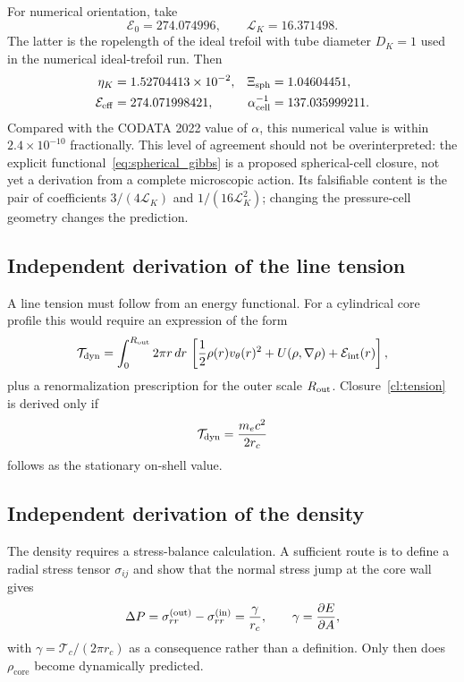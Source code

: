 \documentclass[aps,pra,preprint,longbibliography,nofootinbib]{revtex4-2}
\newcommand{\Et}{\mathcal{E}_0}                    %
\newcommand{\LK}{\mathcal{L}_K}                     %
\newcommand{\Xsph}{\Xi_{\mathrm{sph}}}             %
\begin{document}
For numerical orientation, take
\begin{equation}
  \Et=274.074996,
  \qquad
  \LK=16.371498 .
  \label{eq:numerical_E0_LK}
\end{equation}
The latter is the ropelength of the ideal trefoil with tube diameter
$D_K=1$ used in the numerical ideal-trefoil run.  Then
\begin{align}
  \eta_K &= 1.52704413\times10^{-2},
  &\Xsph &= 1.04604451,
  \label{eq:Xi_numbers}\\
  \mathcal E_{\rm eff} &= 274.071998421,
  &\alpha_{\rm cell}^{-1} &= 137.035999211 .
  \label{eq:alpha_cell_numbers}
\end{align}
Compared with the CODATA 2022 value of $\alpha$, this numerical value is
within $2.4\times10^{-10}$ fractionally.  This level of agreement should
not be overinterpreted: the explicit functional~\eqref{eq:spherical_gibbs}
is a proposed spherical-cell closure, not yet a derivation from a complete
microscopic action.  Its falsifiable content is the pair of coefficients
$3/(4\LK)$ and $1/(16\LK^2)$; changing the pressure-cell geometry changes
the prediction.

\subsection{Independent derivation of the line tension}

A line tension must follow from an energy functional.  For a cylindrical
core profile this would require an expression of the form
\begin{equation}
  \mathcal{T}_{\rm dyn}
  = \int_0^{R_{\rm out}}2\pi r\,dr\,
    \left[\frac{1}{2}\rho(r)v_\theta(r)^2
    +U(\rho,\nabla\rho)+\mathcal{E}_{\rm int}(r)\right],
  \label{eq:needed_tension}
\end{equation}
plus a renormalization prescription for the outer scale $R_{\rm out}$.
Closure~\ref{cl:tension} is derived only if
\begin{equation}
  \mathcal{T}_{\rm dyn}=\frac{m_ec^2}{2r_c}
  \label{eq:tension_target}
\end{equation}
follows as the stationary on-shell value.

\subsection{Independent derivation of the density}

The density requires a stress-balance calculation.  A sufficient route is
to define a radial stress tensor $\sigma_{ij}$ and show that the normal
stress jump at the core wall gives
\begin{equation}
  \Delta P = \sigma_{rr}^{\rm(out)}-\sigma_{rr}^{\rm(in)}
           = \frac{\gamma}{r_c},
  \qquad
  \gamma = \frac{\partial E}{\partial A},
  \label{eq:needed_laplace}
\end{equation}
with $\gamma=\mathcal{T}_c/(2\pi r_c)$ as a consequence rather than a
definition.  Only then does $\rho_{\mathrm{core}}$ become dynamically
predicted.
\end{document}
